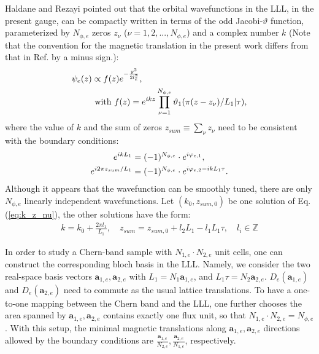 Haldane and Rezayi \cite{haldane1985periodic} pointed out that the orbital wavefunctions in the LLL, in the present gauge, can be compactly written in terms of the odd Jacobi-$\vartheta$ function, parameterized by $N_{\phi,e}$ zeros $z_\nu$ ($\nu=1,2,...,N_{\phi,e}$) and a complex number $k$ (Note that the convention for the magnetic translation in the present work differs from that in Ref.\cite{haldane1985periodic} by a minus sign.):
\begin{align}
    \psi_e(z) & \propto f(z)e^{-\frac{y^2}{2l_e^2}},\notag                                                                         \\
              & \text{ with } f(z)=e^{ikz}\prod_{\nu=1}^{N_{\phi,e}}\vartheta_1(\pi(z-z_\nu)/L_1 | \tau), \label{eq:Haldane_theta}
\end{align}
where the value of $k$ and the sum of zeros $z_{sum}\equiv\sum_{\nu} z_\nu$ need to be consistent with the boundary conditions:
\begin{align}
    e^{ikL_1}               & =(-1)^{N_{\phi,e}}\cdot e^{i\varphi_{e,1}},\notag                       \\
    e^{i 2\pi z_{sum}/L_1 } & =(-1)^{N_{\phi,e}}\cdot e^{i\varphi_{e,2}-ikL_1\tau}. \label{eq:k_z_nu}
\end{align}
Although it appears that the wavefunction can be smoothly tuned, there are only $N_{\phi,e}$ linearly independent wavefunctions. Let $(k_0,z_{sum,0})$ be one solution of Eq.(\ref{eq:k_z_nu}),
the other solutions have the form:
\begin{align}
    k=k_0+\frac{2\pi l_1}{L_1},\quad z_{sum}=z_{sum,0}+l_2 L_1-l_1 L_1\tau, \quad l_i\in\mathbb Z \label{eq:diff_z_sum}
\end{align}

In order to study a Chern-band sample with $N_{1,e}\cdot N_{2,e}$ unit cells, one can construct the corresponding bloch basis in the LLL. Namely, we consider the two real-space basis vectors $\mathbf a_{1,e},\mathbf a_{2,e}$ with $L_1=N_1 \mathbf a_{1,e}$, and $L_1\tau=N_2 \mathbf a_{2,e}$. $D_e(\mathbf a_{1,e})$ and $D_e(\mathbf a_{2,e})$ need to commute as the usual lattice translations. To have a one-to-one mapping between the Chern band and the LLL, one further chooses the area spanned by $\mathbf a_{1,e},\mathbf a_{2,e}$ contains exactly one flux unit, so that $N_{1,e}\cdot N_{2,e}=N_{\phi,e}$. With this setup, the minimal magnetic translations along $\mathbf a_{1,e},\mathbf a_{2,e}$ directions allowed by the boundary conditions are $\frac{\mathbf a_{1,e}}{N_{2,e}},\frac{\mathbf a_{2,e}}{N_{1,e}}$, respectively.

